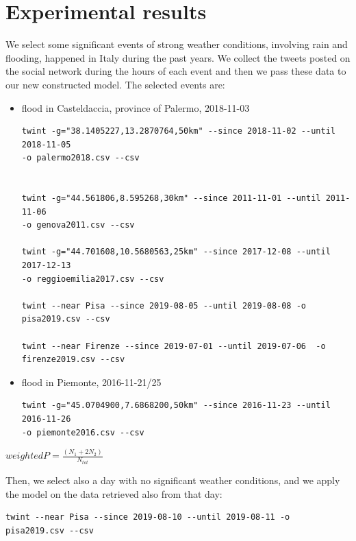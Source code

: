 \documentclass[a4paper]{article}
\begin{document}
\section{Experimental results}
We select some significant events of strong weather conditions, involving rain and flooding, happened in Italy during the past years. We collect the tweets posted on the social network during the hours of each event and then we pass these data to our new constructed model. The selected events are:
\begin{itemize}
\item flood in Casteldaccia, province of Palermo, 2018-11-03
\begin{verbatim}
twint -g="38.1405227,13.2870764,50km" --since 2018-11-02 --until 2018-11-05 
-o palermo2018.csv --csv


twint -g="44.561806,8.595268,30km" --since 2011-11-01 --until 2011-11-06 
-o genova2011.csv --csv

twint -g="44.701608,10.5680563,25km" --since 2017-12-08 --until 2017-12-13 
-o reggioemilia2017.csv --csv

twint --near Pisa --since 2019-08-05 --until 2019-08-08 -o pisa2019.csv --csv

twint --near Firenze --since 2019-07-01 --until 2019-07-06  -o firenze2019.csv --csv
\end{verbatim}
\item flood in Piemonte, 2016-11-21/25
\begin{verbatim}
twint -g="45.0704900,7.6868200,50km" --since 2016-11-23 --until 2016-11-26 
-o piemonte2016.csv --csv
\end{verbatim}
\end{itemize}

\begin{math}
weightedP = \frac{(N_1 + 2N_2)}{N_{tot}}
\end{math}


Then, we select also a day with no significant weather conditions, and we apply the model on the data retrieved also from that day:
\begin{verbatim}
twint --near Pisa --since 2019-08-10 --until 2019-08-11 -o pisa2019.csv --csv
\end{verbatim}
\end{document}
